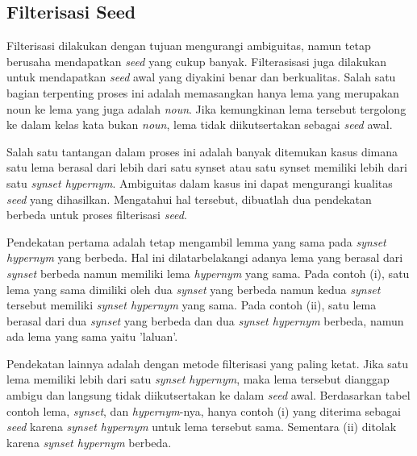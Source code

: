 \subsection{Filterisasi Seed}
Filterisasi dilakukan dengan tujuan mengurangi ambiguitas, namun tetap berusaha mendapatkan \textit{seed} yang cukup banyak. Filterasisasi juga dilakukan untuk mendapatkan \textit{seed} awal yang diyakini benar dan berkualitas. Salah satu bagian terpenting proses ini adalah memasangkan hanya lema yang merupakan noun ke lema yang juga adalah \textit{noun}. Jika kemungkinan lema tersebut tergolong ke dalam kelas kata bukan \textit{noun}, lema tidak diikutsertakan sebagai \textit{seed} awal.

Salah satu tantangan dalam proses ini adalah banyak ditemukan kasus dimana satu lema berasal dari lebih dari satu synset atau satu synset memiliki lebih dari satu \textit{synset hypernym}. Ambiguitas dalam kasus ini dapat mengurangi kualitas \textit{seed} yang dihasilkan. Mengatahui hal tersebut, dibuatlah dua pendekatan berbeda untuk proses filterisasi \textit{seed}.

Pendekatan pertama adalah tetap mengambil lemma yang sama pada \textit{synset hypernym} yang berbeda. Hal ini dilatarbelakangi adanya lema yang berasal dari \textit{synset} berbeda namun memiliki lema \textit{hypernym} yang sama. Pada contoh (i), satu lema yang sama dimiliki oleh dua \textit{synset} yang berbeda namun kedua \textit{synset} tersebut memiliki \textit{synset hypernym} yang sama. Pada contoh (ii), satu lema berasal dari dua \textit{synset} yang berbeda dan dua \textit{synset hypernym} berbeda, namun ada lema yang sama yaitu 'laluan'.

Pendekatan lainnya adalah dengan metode filterisasi yang paling ketat. Jika satu lema memiliki lebih dari satu \textit{synset hypernym}, maka lema tersebut dianggap ambigu dan langsung tidak diikutsertakan ke dalam \textit{seed} awal. Berdasarkan tabel contoh lema, \textit{synset}, dan \textit{hypernym}-nya, hanya contoh (i) yang diterima sebagai \textit{seed} karena \textit{synset hypernym} untuk lema tersebut sama. Sementara (ii) ditolak karena \textit{synset hypernym} berbeda.

